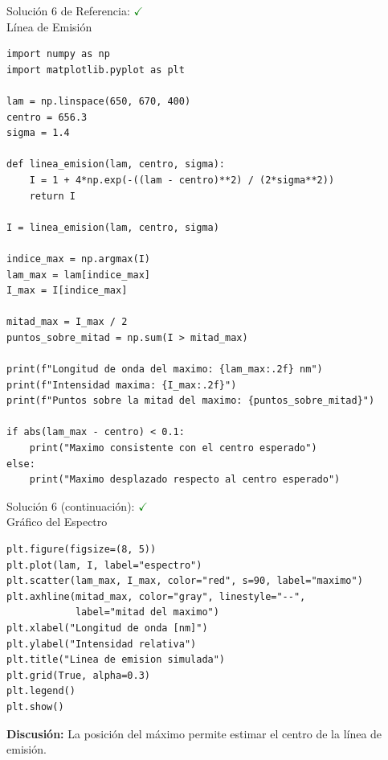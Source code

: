 \documentclass[10pt]{beamer}
\begin{document}
\begin{solutionblock}
\begin{frame}[fragile]{Solución 6 de Referencia: \hfill \textcolor{green}{$\checkmark$} \\ Línea de Emisión}
\begin{Verbatim}[fontsize=\tiny]
import numpy as np
import matplotlib.pyplot as plt

lam = np.linspace(650, 670, 400)
centro = 656.3
sigma = 1.4

def linea_emision(lam, centro, sigma):
    I = 1 + 4*np.exp(-((lam - centro)**2) / (2*sigma**2))
    return I

I = linea_emision(lam, centro, sigma)

indice_max = np.argmax(I)
lam_max = lam[indice_max]
I_max = I[indice_max]

mitad_max = I_max / 2
puntos_sobre_mitad = np.sum(I > mitad_max)

print(f"Longitud de onda del maximo: {lam_max:.2f} nm")
print(f"Intensidad maxima: {I_max:.2f}")
print(f"Puntos sobre la mitad del maximo: {puntos_sobre_mitad}")

if abs(lam_max - centro) < 0.1:
    print("Maximo consistente con el centro esperado")
else:
    print("Maximo desplazado respecto al centro esperado")
\end{Verbatim}
\end{frame}
\end{solutionblock}

\begin{solutionblock}
\begin{frame}[fragile]{Solución 6 (continuación): \hfill \textcolor{green}{$\checkmark$} \\ Gráfico del Espectro}
\begin{Verbatim}[fontsize=\tiny]
plt.figure(figsize=(8, 5))
plt.plot(lam, I, label="espectro")
plt.scatter(lam_max, I_max, color="red", s=90, label="maximo")
plt.axhline(mitad_max, color="gray", linestyle="--",
            label="mitad del maximo")
plt.xlabel("Longitud de onda [nm]")
plt.ylabel("Intensidad relativa")
plt.title("Linea de emision simulada")
plt.grid(True, alpha=0.3)
plt.legend()
plt.show()
\end{Verbatim}
\textbf{Discusión:} La posición del máximo permite estimar el centro de la línea de emisión.
\end{frame}
\end{solutionblock}
\end{document}
